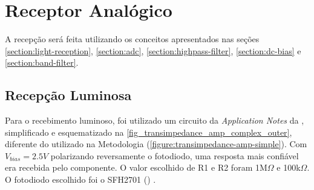 	\section{Receptor Analógico}

	A recepção será feita utilizando os conceitos apresentados nas seções \ref{section:light-reception}, \ref{section:adc},  \ref{section:highpass-filter}, \ref{section:dc-bias} e \ref{section:band-filter}.

	\subsection{Recepção Luminosa}
	Para o recebimento luminoso, foi utilizado um circuito da \emph{Application Notes} da \cite{datasheet-opa380}, simplificado e esquematizado na \autoref{fig_transimpedance_amp_complex_outer}, diferente do utilizado na Metodologia (\autoref{figure:transimpedance-amp-simple}). Com $V_{bias} = 2.5V$ polarizando reversamente o fotodiodo, uma resposta mais confiável era recebida pelo componente. O valor escolhido de R1 e R2 foram  1M$\Omega$ e 100k$\Omega$. O fotodiodo escolhido foi o SFH2701 (\cite{datasheet-sfh2701}) .

